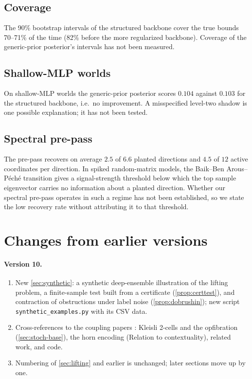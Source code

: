 \documentclass[11pt]{article}
\theoremstyle{definition}
\theoremstyle{remark}
\begin{document}
\subsection{Coverage}
The 90\% bootstrap intervals of the structured backbone cover the true bounds 70--71\% of the time
(82\% before the more regularized backbone). Coverage of the generic-prior posterior's intervals has
not been measured.

\subsection{Shallow-MLP worlds}
On shallow-MLP worlds the generic-prior posterior scores $0.104$ against $0.103$ for the structured
backbone, i.e.\ no improvement. A misspecified level-two shadow is one possible explanation; it has not been
tested.

\subsection{Spectral pre-pass}
The pre-pass recovers on average $2.5$ of $6.6$ planted directions and $4.5$ of $12$ active
coordinates per direction. In spiked random-matrix models, the Baik--Ben Arous--P\'ech\'e transition
\cite{BBP2005} gives a signal-strength threshold below which the top sample eigenvector carries no
information about a planted direction. Whether our spectral pre-pass operates in such a regime has
not been established, so we state the low recovery rate without attributing it to that threshold.

\section{Changes from earlier versions}\label{app:changes}

\paragraph{Version 10.}
\begin{enumerate}[leftmargin=*,label=(\alph*)]
\item New \cref{sec:synthetic}: a synthetic deep-ensemble illustration of the lifting problem, a finite-sample test
  built from a certificate (\cref{prop:certtest}), and contraction of obstructions under label noise
  (\cref{prop:dobrushin}); new script \texttt{synthetic\_examples.py} with its CSV data.
\item Cross-references to the coupling papers \cite{Conditionals,Awasthi-Family}: Kleisli 2-cells and the opfibration
  (\cref{sec:stoch-base}), the horn encoding (Relation to contextuality), related work, and code.
\item Numbering of \cref{sec:lifting} and earlier is unchanged; later sections move up by one.
\end{enumerate}
\end{document}
